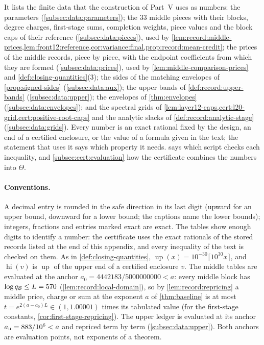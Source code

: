 It lists the finite data that the construction of Part~V uses as numbers: the
parameters (\cref{subsec:data:parameters}); the $33$ middle pieces with their
blocks, degree charges, first-stage sums, completion weights, piece values and
the block caps of their reference (\cref{subsec:data:pieces}), used by
\cref{lem:record:middle-prices,lem:front12:reference,cor:variance:final,prop:record:mean-credit};
the prices of the middle records, piece by piece, with the endpoint
coefficients from which they are formed (\cref{subsec:data:prices}), used by
\cref{lem:middle-comparison-prices} and \cref{def:closing-quantities}(3); the
sides of the matching envelopes of \cref{prop:signed-sides}
(\cref{subsec:data:aux}); the upper bands of \cref{def:record:upper-bands}
(\cref{subsec:data:upper}); the envelopes of \cref{thm:envelopes}
(\cref{subsec:data:envelopes}); and the spectral grids of
\cref{lem:layer12-caps,cert:l20-grid,cert:positive-root-caps} and the analytic
slacks of \cref{def:record:analytic-stage} (\cref{subsec:data:grids}). Every
number is an exact rational fixed by the design, an end of a certified
enclosure, or the value of a formula given in the text; the statement that
uses it says which property it needs.  says which script
checks each inequality, and \cref{subsec:cert:evaluation} how the certificate
combines the numbers into $\Theta$.

\paragraph{Conventions.}
A decimal entry is rounded in the safe direction in its last digit (upward for
an upper bound, downward for a lower bound; the captions name the lower
bounds); integers, fractions and entries marked exact are exact. The tables show
enough digits to identify a number: the certificate uses the exact rationals
of the stored records listed at the end of this appendix, and every inequality
of the text is checked on them. As in \cref{def:closing-quantities},
$\operatorname{up}(x)=10^{-30}\lceil10^{30}x\rceil$, and $\operatorname{hi}(v)$
is $\operatorname{up}$ of the upper end of a certified enclosure $v$. The middle
tables are evaluated at the anchor $a_0=4442183/5000000000<a$: every middle block has
$\log q_{\mathcal B}\le L=570$ (\cref{lem:record:local-domain}), so by
\cref{lem:record:repricing} a middle price, charge or sum at the exponent $a$ of
\cref{thm:baseline} is at most $t=e^{2(a-a_0)L}\in(1,1.00001)$
times its tabulated value (for the first-stage constants,
\cref{cor:first-stage-repricing}). The upper ledger is evaluated at its anchor
$a_{\rm u}=883/10^6<a$ and repriced term by term (\cref{subsec:data:upper}).
Both anchors are evaluation points, not exponents of a theorem.

